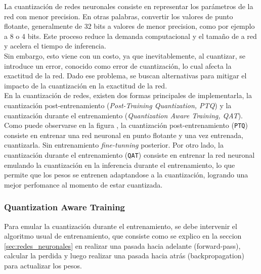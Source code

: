 La cuantización de redes neuronales consiste en representar los parámetros de la red con menor precision. En otras palabras, convertir los valores de punto flotante, generalmente de 32 bits a valores de menor precision, como por ejemplo a 8 o 4 bits. Este proceso reduce la demanda computacional y el tamaño de a red y acelera el tiempo de inferencia. \\

Sin embargo, esto viene con un costo, ya que inevitablemente, al cuantizar, se introduce un error, conocido como error de cuantización, lo cual afecta la exactitud de la red. Dado ese problema, se buscan alternativas para mitigar el impacto de la cuantización en la exactitud de la red. \\


En la cuantización de redes, existen dos formas principales de implementarla, la cuantización post-entrenamiento (\textit{Post-Training Quantization, PTQ}) y la cuantización durante el entrenamiento (\textit{Quantization Aware Training, QAT}). \\

Como puede observarse en la figura , la cuantización post-entrenamiento (\texttt{PTQ}) consiste en entrenar una red neuronal en punto flotante y una vez entrenada, cuantizarla. Sin entrenamiento \textit{fine-tunning} posterior. Por otro lado, la cuantización durante el entrenamiento (\texttt{QAT}) consiste en entrenar la red neuronal emulando la cuantización en la inferencia durante el entrenamiento, lo que permite que los pesos se entrenen adaptandose a la cuantización, logrando una mejor perfomance al momento de estar cuantizada. \\

% 

\subsubsection{Quantization Aware Training}

Para emular la cuantización durante el entrenamiento, se debe intervenir el algoritmo usual de entrenamiento, que consiste como se explico en la seccion \ref{sec:redes_neuronales} en realizar una pasada hacia adelante (forward-pass), calcular la perdida y luego realizar una pasada hacia atrás (backpropagation) para actualizar los pesos. \\

